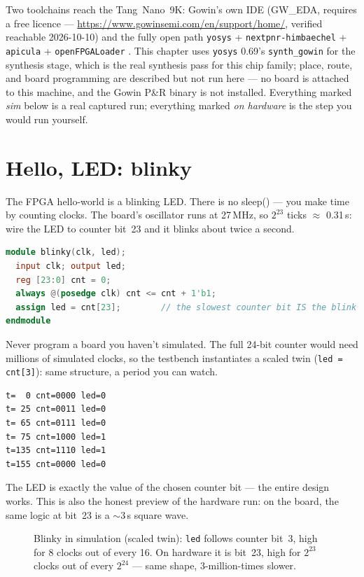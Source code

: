 Two toolchains reach the Tang~Nano~9K: Gowin's own IDE (GW\_EDA, requires a
free licence --- \url{https://www.gowinsemi.com/en/support/home/}, verified reachable 2026-10-10) and the
fully open path \texttt{yosys} + \texttt{nextpnr-himbaechel} + \texttt{apicula}
+ \texttt{openFPGALoader} \cite{apicula}. This chapter uses \texttt{yosys}
0.69's \texttt{synth\_gowin} for the synthesis stage, which is the real
synthesis pass for this chip family; place, route, and board programming are
described but not run here --- no board is attached to this machine, and the
Gowin P\&R binary is not installed. Everything marked \emph{sim} below is a
real captured run; everything marked \emph{on hardware} is the step you would
run yourself.

\section{Hello, LED: blinky}

The FPGA hello-world is a blinking LED. There is no sleep() --- you make time
by counting clocks. The board's oscillator runs at 27\,MHz, so
$2^{23}$ ticks $\approx$ 0.31\,s: wire the LED to counter bit~23 and it blinks
about twice a second.

\begin{lstlisting}[language=Verilog]
module blinky(clk, led);
  input clk; output led;
  reg [23:0] cnt = 0;
  always @(posedge clk) cnt <= cnt + 1'b1;
  assign led = cnt[23];        // the slowest counter bit IS the blink
endmodule
\end{lstlisting}

\begin{example}
Never program a board you haven't simulated. The full 24-bit counter would
need millions of simulated clocks, so the testbench instantiates a scaled
twin (\texttt{led = cnt[3]}): same structure, a period you can watch.

\begin{lstlisting}
t=  0 cnt=0000 led=0
t= 25 cnt=0011 led=0
t= 65 cnt=0111 led=0
t= 75 cnt=1000 led=1
t=135 cnt=1110 led=1
t=155 cnt=0000 led=0
\end{lstlisting}

The LED is exactly the value of the chosen counter bit --- the entire design
works. This is also the honest preview of the hardware run: on the board, the
same logic at bit~23 is a $\sim$3\,s square wave.
\end{example}

\begin{figure}[htbp]\centering

\caption{Blinky in simulation (scaled twin): \texttt{led} follows counter
bit~3, high for 8 clocks out of every 16. On hardware it is bit~23, high for
$2^{23}$ clocks out of every $2^{24}$ --- same shape, 3-million-times slower.}
\label{fig:wave13}
\end{figure}

